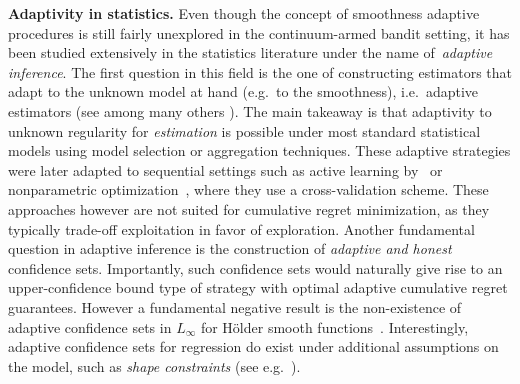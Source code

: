 \documentclass[final,12pt]{colt2018}
\begin{document}
\noindent\textbf{Adaptivity in statistics.} Even though the concept of smoothness adaptive procedures is still fairly unexplored in the continuum-armed bandit setting, it has been studied extensively in the statistics literature under the name of~\textit{adaptive inference}. The first question in this field is the one of constructing estimators that adapt to the unknown model at hand (e.g.~to the smoothness), i.e.~adaptive estimators (see among many others \cite{golubev1987adaptive, birge1997model, lepski1997optimal,tsybakov2004optimal}). The main takeaway is that adaptivity to unknown regularity for \emph{estimation} is possible under most standard statistical models using model selection or aggregation techniques. These adaptive strategies were later adapted to sequential settings such as active learning by~\cite{Hann2,Kolt, minsker2012non,locatelli2017adaptivity} or nonparametric optimization~\cite{grill2015black}, where they use a cross-validation scheme. These approaches however are not suited for cumulative regret minimization, as they typically trade-off exploitation in favor of exploration. Another fundamental question in adaptive inference is the construction of \emph{adaptive and honest} confidence sets. Importantly, such confidence sets would naturally give rise to an upper-confidence bound type of strategy with optimal adaptive cumulative regret guarantees. However a fundamental negative result is the non-existence of adaptive confidence sets in $L_\infty$ for Hölder smooth functions~\cite{juditsky2003nonparametric, cai2006adaptive,hoffmann2011adaptive}. Interestingly, adaptive confidence sets for regression do exist under additional assumptions on the model, such as \emph{shape constraints} (see e.g.~\cite{cai2013adaptive,bellec2016adaptive}). 
\end{document}
